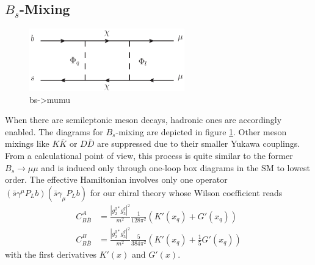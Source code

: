 \subsection{$B_s$-Mixing}
\begin{figure}[t]
 \includegraphics[width=0.6\textwidth]{../pics/bsmumu.eps}
 \caption{bs->mumu}
 \label{pic_Bsmix}
\end{figure}
When there are semileptonic meson decays, hadronic ones are accordingly enabled. The diagrams for $B_s$-mixing are depicted in figure \ref{pic_Bsmix}. Other
meson mixings like $K\bar K$ or $ D \bar D$ are suppressed due to their smaller Yukawa couplings. From a calculational point of view, this process is 
quite similar to the former $B_s\rightarrow \mu\mu$ and is induced only through one-loop box diagrams in the SM to lowest order. The effective Hamiltonian
involves only one operator $(\bar s \gamma^\mu P_L b)(\bar s \gamma_\mu P_L b)$ for our chiral theory whose Wilson coefficient reads
\begin{align}
 C_{B\bar B}^A &=  \frac{|g_2^{q*}g_3^q|^2}{m^2} \frac{1}{128\pi^2} \left(K'(x_q) + G'(x_q)\right)\\
 C_{B\bar B}^B &=  \frac{|g_2^{q*}g_3^q|^2}{m^2} \frac{5}{384\pi^2} \left(K'(x_q) + \frac15 G'(x_q)\right)
\end{align}
with the first derivatives $K'(x)$ and $G'(x)$. 

